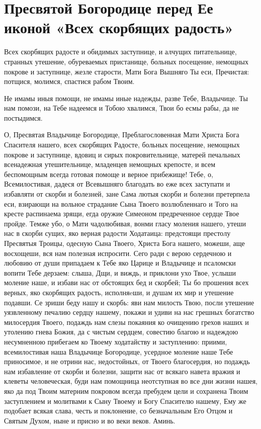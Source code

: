 \section{Пресвятой Богородице перед Ее иконой «Всех скорбящих радость»}\begin{mymulticols}


Всех скорбящих радосте и обидимых заступнице, и алчущих питательнице, странных утешение, обуреваемых пристанище, больных посещение, немощных покрове и заступнице, жезле старости, Мати Бога Вышняго Ты еси, Пречистая: потщися, молимся, спастися рабом Твоим.


Не имамы иныя помощи, не имамы иные надежды, разве Тебе, Владычице. Ты нам помози, на Тебе надеемся и Тобою хвалимся, Твои бо есмы рабы, да не постыдимся.


О, Пресвятая Владычице Богородице, Преблагословенная Мати Христа Бога Спасителя нашего, всех скорбящих Радосте, больных посещение, немощных покрове и заступнице, вдовиц и сирых покровительнице, матерей печальных всенадежная утешительнице, младенцев немощных крепосте, и всем беспомощным всегда готовая помоще и верное прибежище! Тебе, о, Всемилостивая, дадеся от Всевышняго благодать во еже всех заступати и избавляти от скорби и болезней, зане Сама лютыя скорби и болезни претерпела еси, взирающи на вольное страдание Сына Твоего возлюбленнаго и Того на кресте распинаема зрящи, егда оружие Симеоном предреченное сердце Твое пройде. Темже убо, о Мати чадолюбивая, вонми гласу моления нашего, утеши нас в скорби сущих, яко верная радости Ходатаица: предстоящи престолу Пресвятыя Троицы, одесную Сына Твоего, Христа Бога нашего, можеши, аще восхощеши, вся нам полезная испросити. Сего ради с верою сердечною и любовию от души припадаем к Тебе яко Царице и Владычице и псаломски вопити Тебе дерзаем: слыша, Дщи, и виждь, и приклони ухо Твое, услыши моление наше, и избави нас от обстоящих бед и скорбей; Ты бо прошения всех верных, яко скорбящих радость, исполняeши, и душам их мир и утешение подавши. Се зриши беду нашу и скорбь: яви нам милость Твою, посли утешение уязвленному печалию сердцу нашему, покажи и удиви на нас грешных богатство милосердия Твоего, подаждь нам слезы покаяния ко очищению грехов наших и утолению гнева Божия, да с чистым сердцем, совестию благою и надеждою несумненною прибегаем ко Твоему ходатайству и заступлению: приими, всемилостивая наша Владычице Богородице, усердное моление наше Тебе приносимое, и не отрини нас, недостойных, от Твоего благосердия, но подаждь нам избавление от скорби и болезни, защити нас от всякаго навета вражия и клеветы человеческая, буди нам помощница неотступная во все дни жизни нашея, яко да под Твоим матерним покровом всегда пребудем цели и сохранена Твоим заступлением и молитвами к Сыну Твоему и Богу Спасителю нашему, Ему же подобает всякая слава, честь и поклонение, со безначальным Его Отцом и Святым Духом, ныне и присно и во веки веков. Аминь.

\end{mymulticols}

